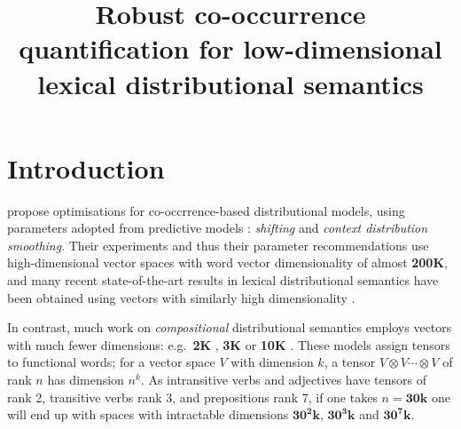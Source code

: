 \documentclass[11pt]{article}
\title{Robust co-occurrence quantification for low-dimensional lexical distributional semantics}
\date{}
\begin{document}
\def\emnlp/{\textit{KS2013}}
\def\PhraseRel/{PhraseRel}

\def\PMI/{$1 \operatorname{PMI}$}
\def\SPMI/{$1 \operatorname{SPMI}$}
\def\CPMI/{$1 \operatorname{CPMI}$}
\def\SCPMI/{$1 \operatorname{SCPMI}$}

\def\NPMI/{$n \operatorname{PMI}$}
\def\NSPMI/{$n \operatorname{SPMI}$}
\def\NCPMI/{$n \operatorname{CPMI}$}
\def\NSCPMI/{$n \operatorname{SCPMI}$}

\def\logNPMI/{$\log n\operatorname{PMI}$}
\def\logNSPMI/{$\log n\operatorname{SPMI}$}
\def\logNCPMI/{$\log n \operatorname{CPMI}$}
\def\logNSCPMI/{$\log n \operatorname{SCPMI}$}

\maketitle
\begin{abstract}

\end{abstract}

\section{Introduction}
\label{sec:introduction}

 propose optimisations for co-occrrence-based distributional models, using parameters adopted from predictive models \cite{mikolov2013efficient}: \emph{shifting} and \emph{context distribution smoothing}. Their experiments and thus their parameter  recommendations use high-dimensional vector spaces with word vector dimensionality of almost \textbf{200K}, and many recent state-of-the-art results in lexical distributional semantics have been obtained using vectors with similarly high dimensionality  \cite{baroni-dinu-kruszewski:2014:P14-1,kiela-clark:2014:CVSC,lapesa2014large}.

In contrast, much work on \emph{compositional} distributional semantics employs vectors with much fewer dimensions: e.g.~\textbf{2K} \cite{Grefenstette:2011:ESC:2145432.2145580,kartsadrqpl2014,milajevs-EtAl:2014:EMNLP2014}, \textbf{3K} \cite{Dinu:2010:MDS:1870658.1870771,milajevs-purver:2014:CVSC} or \textbf{10K} \cite{polajnar-clark:2014:EACL,Baroni2010nouns}. These models  assign tensors to functional words; for a vector space $V$ with dimension $k$,  a tensor $V \otimes V \cdots \otimes V$ of rank $n$ has dimension  $n^k$. As intransitive verbs and adjectives have  tensors of rank 2,  transitive verbs  rank 3, and prepositions rank 7, 
if one takes $n= \textbf{30k}$ one will end up with   spaces with intractable dimensions  $\textbf{30}^\textbf{2} \textbf{k}$, $\textbf{30}^\textbf{3} \textbf{k}$ and $\textbf{30}^\textbf{7} \textbf{k}$. 
\end{document}
